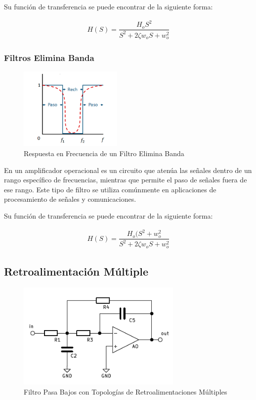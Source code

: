             Su función de transferencia se puede encontrar de la siguiente forma:

            \begin{gather}
                H(S)=\dfrac{H_oS^2}{S^2+2\zeta w_oS+w_o^2}
            \end{gather}

         \subsubsection{Filtros Elimina Banda}

            \begin{figure}[H]
                \centering
                \includegraphics[width=5cm]{Imagenes/elimina_banda.png}
                \caption{Respuesta en Frecuencia de un Filtro Elimina Banda}
                \label{fig:elimina_banda}
            \end{figure} 

            En un amplificador operacional es un circuito que atenúa las señales dentro de un rango específico de frecuencias, mientras que permite el paso de señales fuera de ese rango. Este tipo de filtro se utiliza comúnmente en aplicaciones de procesamiento de señales y comunicaciones. 
            
            Su función de transferencia se puede encontrar de la siguiente forma:

            \begin{gather}
                H(S)=\dfrac{H_o(S^2+w_o^2}{S^2+2\zeta w_oS+w_o^2}
            \end{gather}

    \subsection{Retroalimentación Múltiple}

        \begin{figure}[H]
              \centering
              \includegraphics[width=8cm]{Imagenes/retro_multiples.png}
              \caption{Filtro Pasa Bajos con Topologías de Retroalimentaciones Múltiples}
              \label{fig:retro_multiples0}
        \end{figure}

